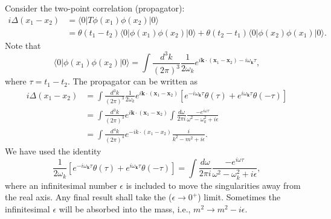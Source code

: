 Consider the two-point correlation (propagator):
\begin{equation*}
\begin{aligned}
	i\Delta(x_1-x_2) &= \langle 0|T \phi(x_1) \phi(x_2) |0\rangle \\
	&= \theta(t_1-t_2) \langle 0|\phi(x_1) \phi(x_2) |0\rangle 
	+ \theta(t_2-t_1) \langle 0|\phi(x_2) \phi(x_1) |0\rangle.
\end{aligned}
\end{equation*}
Note that
\begin{equation}
	\langle 0|\phi(x_1) \phi(x_2) |0\rangle
	= \int\frac{d^{3} k}{(2\pi)^{3}}\frac{1}{2\omega_k} e^{i\bm k\cdot (\bm x_1-\bm x_2)-i\omega_{\bm k}\tau},
\end{equation}
where $\tau =t_1-t_2$.
The propagator can be written as
\begin{equation}
\begin{aligned}
	i\Delta(x_1-x_2) 
	&= \int\frac{d^{3} k}{(2\pi)^{3}}\frac{1}{2\omega_k} e^{i\bm k\cdot (\bm x_1-\bm x_2)}\left[e^{-i\omega_{\bm k}\tau}\theta(\tau)+e^{i\omega_{\bm k}\tau}\theta(-\tau)\right] \\
	&= \int\frac{d^{3} k}{(2\pi)^{3}} e^{i\bm k\cdot (\bm x_1-\bm x_2)}\int \frac{d\omega}{2\pi i}\frac{-e^{i\omega\tau}}{\omega^2-\omega_k^2+i\epsilon} \\
	&= \int\frac{d^{4} k}{(2\pi)^{4}} e^{-i k\cdot (x_1-x_2)}\frac{i}{k^2-m^2+i\epsilon}.
\end{aligned}
\end{equation}
We have used the identity
\begin{equation*}
	\frac{1}{2\omega_k} \left[e^{-i\omega_{\bm k}\tau}\theta(\tau)+e^{i\omega_{\bm k}\tau}\theta(-\tau)\right] 
	= \int \frac{d\omega}{2\pi i} \frac{-e^{i\omega\tau}}{\omega^2-\omega_k^2+i\epsilon},
\end{equation*}
where an infinitesimal number $\epsilon$ is included to move the singularities away from the real axis.
Any final result shall take the ($\epsilon \rightarrow 0^+$) limit.
Sometimes the infinitesimal $\epsilon$ will be absorbed into the mass, i.e., $m^2 \rightarrow m^2-i\epsilon$.



